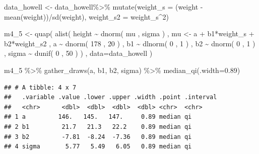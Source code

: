 \documentclass[
]{book}
\newenvironment{Shaded}{\begin{snugshade}}{\end{snugshade}}
\newcommand{\AttributeTok}[1]{\textcolor[rgb]{0.77,0.63,0.00}{#1}}
\newcommand{\DecValTok}[1]{\textcolor[rgb]{0.00,0.00,0.81}{#1}}
\newcommand{\FloatTok}[1]{\textcolor[rgb]{0.00,0.00,0.81}{#1}}
\newcommand{\FunctionTok}[1]{\textcolor[rgb]{0.00,0.00,0.00}{#1}}
\newcommand{\NormalTok}[1]{#1}
\newcommand{\OtherTok}[1]{\textcolor[rgb]{0.56,0.35,0.01}{#1}}
\newcommand{\SpecialCharTok}[1]{\textcolor[rgb]{0.00,0.00,0.00}{#1}}
\begin{document}
\begin{Shaded}
\begin{Highlighting}[]
\NormalTok{data\_howell }\OtherTok{\textless{}{-}}\NormalTok{ data\_howell}\SpecialCharTok{\%\textgreater{}\%}
  \FunctionTok{mutate}\NormalTok{(}\AttributeTok{weight\_s =}\NormalTok{ (weight }\SpecialCharTok{{-}} \FunctionTok{mean}\NormalTok{(weight))}\SpecialCharTok{/}\FunctionTok{sd}\NormalTok{(weight),}
         \AttributeTok{weight\_s2 =}\NormalTok{ weight\_s}\SpecialCharTok{\^{}}\DecValTok{2}\NormalTok{)}

\NormalTok{m4\_5 }\OtherTok{\textless{}{-}} \FunctionTok{quap}\NormalTok{(}
    \FunctionTok{alist}\NormalTok{(}
\NormalTok{        height }\SpecialCharTok{\textasciitilde{}} \FunctionTok{dnorm}\NormalTok{( mu , sigma ) ,}
\NormalTok{        mu }\OtherTok{\textless{}{-}}\NormalTok{ a }\SpecialCharTok{+}\NormalTok{ b1}\SpecialCharTok{*}\NormalTok{weight\_s }\SpecialCharTok{+}\NormalTok{ b2}\SpecialCharTok{*}\NormalTok{weight\_s2 ,}
\NormalTok{        a }\SpecialCharTok{\textasciitilde{}} \FunctionTok{dnorm}\NormalTok{( }\DecValTok{178}\NormalTok{ , }\DecValTok{20}\NormalTok{ ) ,}
\NormalTok{        b1 }\SpecialCharTok{\textasciitilde{}} \FunctionTok{dlnorm}\NormalTok{( }\DecValTok{0}\NormalTok{ , }\DecValTok{1}\NormalTok{ ) ,}
\NormalTok{        b2 }\SpecialCharTok{\textasciitilde{}} \FunctionTok{dnorm}\NormalTok{( }\DecValTok{0}\NormalTok{ , }\DecValTok{1}\NormalTok{ ) ,}
\NormalTok{        sigma }\SpecialCharTok{\textasciitilde{}} \FunctionTok{dunif}\NormalTok{( }\DecValTok{0}\NormalTok{ , }\DecValTok{50}\NormalTok{ )}
\NormalTok{    ) , }\AttributeTok{data=}\NormalTok{data\_howell )}

\NormalTok{m4\_5 }\SpecialCharTok{\%\textgreater{}\%}
  \FunctionTok{gather\_draws}\NormalTok{(a, b1, b2, sigma) }\SpecialCharTok{\%\textgreater{}\%}
  \FunctionTok{median\_qi}\NormalTok{(}\AttributeTok{.width=}\FloatTok{0.89}\NormalTok{)}
\end{Highlighting}
\end{Shaded}

\begin{verbatim}
## # A tibble: 4 x 7
##   .variable .value .lower .upper .width .point .interval
##   <chr>      <dbl>  <dbl>  <dbl>  <dbl> <chr>  <chr>    
## 1 a         146.   145.   147.     0.89 median qi       
## 2 b1         21.7   21.3   22.2    0.89 median qi       
## 3 b2         -7.81  -8.24  -7.36   0.89 median qi       
## 4 sigma       5.77   5.49   6.05   0.89 median qi
\end{verbatim}
\end{document}
